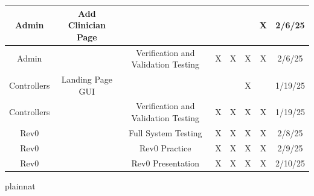 \documentclass[12pt, titlepage]{article}
\begin{document}
\begin{landscape}
\begin{longtable}{|c|c|c|c|c|c|c|c|}
      Admin & Add Clinician Page & ~ & ~ & ~ & ~ & X & 2/6/25 \\ \hline
      Admin & ~ & Verification and Validation Testing & X & X & X & X & 2/6/25 \\ \hline
      Controllers & Landing Page GUI & ~ & ~ & ~ & X & ~ & 1/19/25 \\ \hline
      Controllers & ~ & Verification and Validation Testing & X & X & X & X & 1/19/25 \\ \hline
      Rev0 & ~ & Full System Testing & X & X & X & X & 2/8/25 \\ \hline
      Rev0 & ~ & Rev0 Practice & X & X & X & X & 2/9/25 \\ \hline
      Rev0 & ~ & Rev0 Presentation & X & X & X & X & 2/10/25 \\ \hline
\end{longtable}
\normalsize
\end{landscape}

 {plainnat}


\newpage{}
\end{document}
